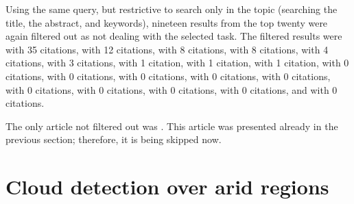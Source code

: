 Using the same query, but restrictive to search only in the topic (searching the title, the abstract, and keywords), nineteen results from the top twenty were again filtered out as not dealing with the selected task. The filtered results were \cite{crystal-structure-cnn} with 35 citations, \cite{cnn-neuroimaging} with 12 citations, \cite{real-time-management} with 8 citations, \cite{dl-age-estimation} with 8 citations, \cite{animal-species-cnn} with 4 citations, \cite{ground-measurement-forest} with 3 citations, \cite{w-net-lc} with 1 citation, \cite{ai-infection-biology} with 1 citation, \cite{dl-brain-stimulation} with 1 citation, \cite{language-network-dl} with 0 citations, \cite{reproductive-structures-herbarium} with 0 citations, \cite{limb-rehabilitation} with 0 citations, \cite{review-crowd-monitoring} with 0 citations, \cite{optical-coherence-tomography} with 0 citations, \cite{autism-disorder-corrigendum} with 0 citations, \cite{smartphone-photorefraction} with 0 citations, \cite{dl-galapagos-snake} with 0 citations, \cite{autism-disorder} with 0 citations, and \cite{acoustic-scene} with 0 citations.

The only article not filtered out was \cite{urban-green-unsupervised-aerial}. This article was presented already in the previous section; therefore, it is being skipped now.

\section{Cloud detection over arid regions}
\label{cloud-detection}


